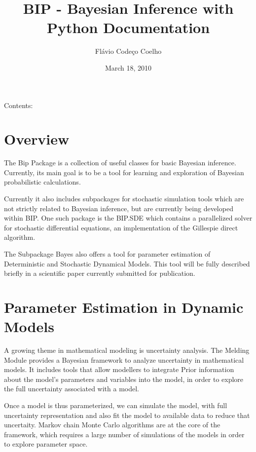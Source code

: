 \documentclass[a4paper,10pt,english]{manual}
\title{BIP - Bayesian Inference with Python Documentation}
\date{March 18, 2010}
\author{Flávio Codeço Coelho}
\begin{document}
\maketitle
\tableofcontents
\hypertarget{--doc-index}{}


Contents:

\resetcurrentobjects
\hypertarget{--doc-overview}{}

\chapter{Overview}

The Bip Package is a collection of useful classes for basic Bayesian inference. Currently, its main goal is to be a tool for learning and exploration of Bayesian probabilistic calculations.

Currently it also includes subpackages for stochastic simulation tools which are not strictly related to Bayesian inference, but are currently being developed within BIP. One such package is the BIP.SDE which contains a parallelized solver for stochastic differential equations, an implementation of the Gillespie direct algorithm.

The Subpackage Bayes also offers a tool for parameter estimation of Deterministic and Stochastic Dynamical Models. This tool will be fully described briefly in a scientific paper currently submitted for publication.

\resetcurrentobjects
\hypertarget{--doc-paramest}{}

\chapter{Parameter Estimation in Dynamic Models}

A growing theme in mathematical modeling is uncertainty analysis. The Melding Module provides a Bayesian framework to analyze uncertainty in mathematical models. It includes tools that allow modellers to integrate Prior information about the model's parameters and variables into the model, in order to explore the full uncertainty associated with a model.

Once a model is thus parameterized, we can simulate the model, with full uncertainty representation and also fit the model to available data to reduce that uncertaity. Markov chain Monte Carlo algorithms are at the core of the framework, which requires a large number of simulations of the models in order to explore parameter space.
\end{document}
